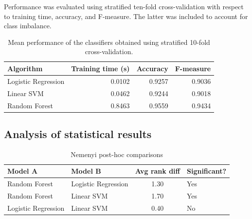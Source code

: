 \documentclass[conference]{IEEEtran}
\begin{document}
Performance was evaluated using stratified ten-fold cross-validation with respect to training time, accuracy, and F-measure. The latter was included to account for class imbalance.


\begin{table}[h]
\centering
\caption{Mean performance of the classifiers obtained using stratified 10-fold cross-validation.}
\label{tab:summary_results}
\begin{tabular}{@{}lrrr@{}}
\toprule
Algorithm & Training time (s) & Accuracy & F-measure \\
\midrule
Logistic Regression & 0.0102 & 0.9257 & 0.9036 \\
Linear SVM & 0.0462 & 0.9244 & 0.9018 \\
Random Forest & 0.8463 & 0.9559 & 0.9434 \\
\bottomrule
\end{tabular}
\end{table}




\subsection{Analysis of statistical results}


\begin{table}[t]
\centering
\caption{Nemenyi post-hoc comparisons}
\label{tab:nemenyi}
\setlength{\tabcolsep}{5pt} %
\renewcommand{\arraystretch}{1.05}
\begin{tabular}{@{}llcl@{}}
\toprule
Model A & Model B & Avg rank diff & Significant? \\
\midrule
Random Forest & Logistic Regression & 1.30 & Yes \\
Random Forest & Linear SVM & 1.70 & Yes \\
Logistic Regression & Linear SVM & 0.40 & No \\
\bottomrule
\end{tabular}
\end{table}
\end{document}
